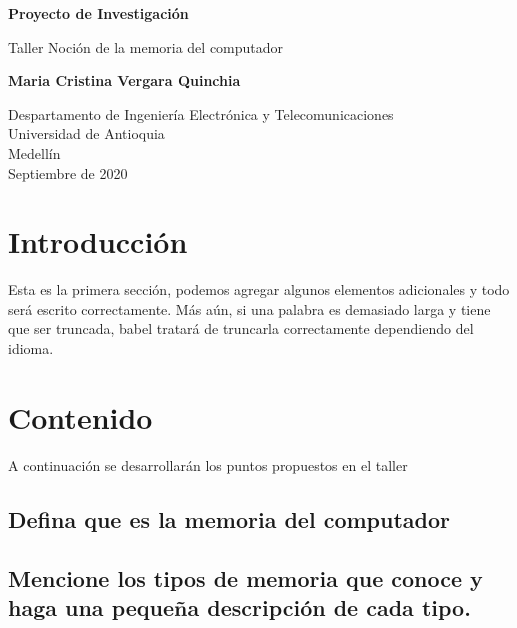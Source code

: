 \documentclass{article}
\begin{document}
\begin{titlepage}
    \begin{center}
        \vspace*{1cm}
            
        \Huge
        \textbf{Proyecto de Investigación}
            
        \vspace{0.5cm}
        \LARGE
        Taller Noción de la memoria del computador
            
        \vspace{1.5cm}
            
        \textbf{Maria Cristina Vergara Quinchia}
            
        \vfill
            
        \vspace{0.8cm}
            
        \Large
        Despartamento de Ingeniería Electrónica y Telecomunicaciones\\
        Universidad de Antioquia\\
        Medellín\\
        Septiembre de 2020
            
    \end{center}
\end{titlepage}

\tableofcontents
\newpage
\section{Introducción}\label{intro}
Esta es la primera sección, podemos agregar algunos elementos adicionales y todo será escrito correctamente. Más aún, si una palabra es demasiado larga y tiene que ser truncada, babel tratará de truncarla correctamente dependiendo del idioma.

\section{Contenido} \label{contenido}
A continuación se desarrollarán los puntos propuestos en el taller 
\subsection{Defina que es la memoria del computador}


\subsection{Mencione los tipos de memoria que conoce y haga una pequeña descripción de cada tipo.}
\end{document}
